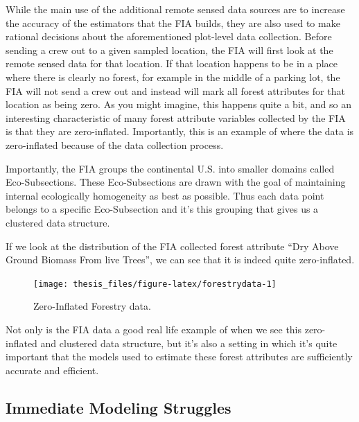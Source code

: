 \documentclass[12pt,twoside]{reedthesis}
\begin{document}
While the main use of the additional remote sensed data sources are to increase the accuracy of the estimators that the FIA builds, they are also used to make rational decisions about the aforementioned plot-level data collection. Before sending a crew out to a given sampled location, the FIA will first look at the remote sensed data for that location. If that location happens to be in a place where there is clearly no forest, for example in the middle of a parking lot, the FIA will not send a crew out and instead will mark all forest attributes for that location as being zero. As you might imagine, this happens quite a bit, and so an interesting characteristic of many forest attribute variables collected by the FIA is that they are zero-inflated. Importantly, this is an example of where the data is zero-inflated because of the data collection process.

Importantly, the FIA groups the continental U.S. into smaller domains called Eco-Subsections. These Eco-Subsections are drawn with the goal of maintaining internal ecologically homogeneity as best as possible. Thus each data point belongs to a specific Eco-Subsection and it's this grouping that gives us a clustered data structure.

If we look at the distribution of the FIA collected forest attribute ``Dry Above Ground Biomass From live Trees'', we can see that it is indeed quite zero-inflated.
\begin{figure}

{\centering \texttt{[image: thesis\_files/figure-latex/forestrydata-1]} 

}

\caption{Zero-Inflated Forestry data.}\label{fig:forestrydata}
\end{figure}
Not only is the FIA data a good real life example of when we see this zero-inflated and clustered data structure, but it's also a setting in which it's quite important that the models used to estimate these forest attributes are sufficiently accurate and efficient.

\hypertarget{immediate-modeling-struggles}{%
\subsection{Immediate Modeling Struggles}\label{immediate-modeling-struggles}}
\end{document}
